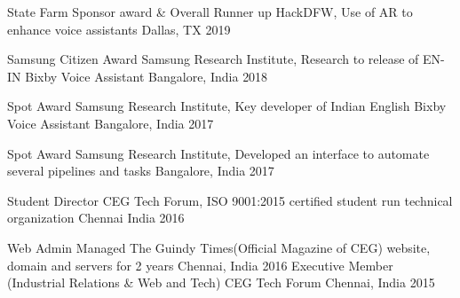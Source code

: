 



\begin{cvhonors}

  \cvhonor
    {State Farm Sponsor award \& Overall Runner up} %
    {HackDFW, Use of AR to enhance voice assistants} %
    {Dallas, TX} %
    {2019} %


  \cvhonor
    {Samsung Citizen Award} %
    {Samsung Research Institute, Research to release of EN-IN Bixby Voice Assistant} %
    {Bangalore, India} %
    {2018} %

  \cvhonor
    {Spot Award} %
    {Samsung Research Institute, Key developer of Indian English Bixby Voice Assistant} %
    {Bangalore, India} %
    {2017} %

  \cvhonor
    {Spot Award} %
    {Samsung Research Institute, Developed an interface to automate several pipelines and tasks} %
    {Bangalore, India} %
    {2017} %

  \cvhonor
    {Student Director} %
    {CEG Tech Forum, ISO 9001:2015 certified student run technical organization} %
    {Chennai India} %
    {2016} %

  \cvhonor
  {Web Admin} %
  {Managed The Guindy Times(Official Magazine of CEG) website, domain and servers for 2 years} %
  {Chennai, India} %
  {2016} %
%
  \cvhonor
    {Executive Member (Industrial Relations \& Web and Tech)} %
    {CEG Tech Forum} %
    {Chennai, India} %
    {2015} %
%
%

\end{cvhonors}
